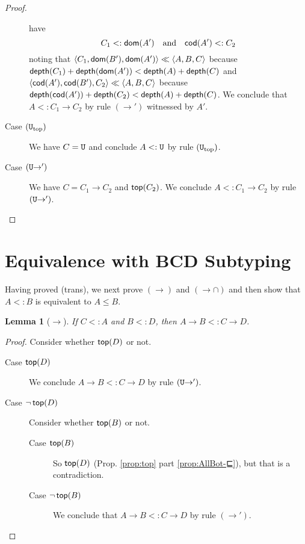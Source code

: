 \documentclass{article}
\newtheorem{lemma}[theorem]{Lemma}
\begin{document}
\begin{proof}
\begin{description}
    have
    \[
    C_1 <: \mathsf{dom}(A') \quad\text{and}\quad \mathsf{cod}(A') <: C_2
    \]
    noting that
    $\langle C_1, \mathsf{dom}(B'), \mathsf{dom}(A') \rangle \ll \langle A, B, C \rangle$
    because $\mathsf{depth}(C_1) + \mathsf{depth}(\mathsf{dom}(A')) < \mathsf{depth}(A) + \mathsf{depth}(C)$
    and
    $\langle \mathsf{cod}(A'), \mathsf{cod}(B'), C_2 \rangle \ll \langle A, B, C \rangle$
    because $\mathsf{depth}(\mathsf{cod}(A')) + \mathsf{depth}(C_2) < \mathsf{depth}(A) + \mathsf{depth}(C)$.
    We conclude that $A <: C_1 \to C_2$ by rule $(\to')$ witnessed by $A'$.
  \item[Case $(\mathtt{U}_{\mathrm{top}})$] We have $C = \mathtt{U}$ and
    conclude $A <: \mathtt{U}$ by rule $(\mathtt{U}_{\mathrm{top}})$.
  \item[Case $(\mathtt{U}{\to}')$] We have $C = C_1 \to C_2$ and $\mathsf{top}(C_2)$.
    We conclude $A <: C_1 \to C_2$ by rule $(\mathtt{U}{\to}')$.
  \end{description}
\end{proof}


\section{Equivalence with BCD Subtyping}
\label{sec:equiv}

Having proved (trans), we next prove $(\to)$ and $({\to}{\cap})$
and then show that $A <: B$ is equivalent to $A \leq B$.

\begin{lemma}[$\to$]\label{lem:⊑-fun′}
  If $C <: A$ and $B <: D$, then
  $A \to B <: C \to D$.
\end{lemma}
\begin{proof}
  Consider whether $\mathsf{top}(D)$ or not.
  \begin{description}
  \item[Case $\mathsf{top}(D)$] We conclude $A \to B <: C \to D$
    by rule $(\mathtt{U}{\to}')$.
  \item[Case $\neg \,\mathsf{top}(D)$]
    Consider whether $\mathsf{top}(B)$ or not.
    \begin{description}
    \item[Case $\mathsf{top}(B)$] So $\mathsf{top}(D)$ (Prop. \ref{prop:top}
      part \ref{prop:AllBot-⊑}), but that is a contradiction.
    \item[Case $\neg\,\mathsf{top}(B)$]
      We conclude that $A \to B <: C \to D$ by rule $(\to')$.
    \end{description}
  \end{description}
\end{proof}
\end{document}
